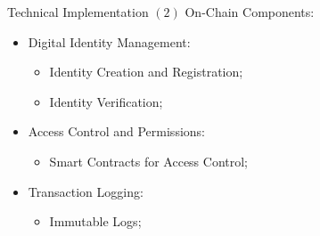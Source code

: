 \documentclass{beamer}
\begin{document}
\begin{frame}{Technical Implementation $(2)$}
\alert{On-Chain Components}:
\begin{itemize}
\item Digital Identity Management:
	\begin{itemize}
		\item Identity Creation and Registration; 
		\item Identity Verification; 
	\end{itemize}
\item Access Control and Permissions:
	\begin{itemize}
		\item Smart Contracts for Access Control; 
	\end{itemize}
\item Transaction Logging:
	\begin{itemize}
		\item Immutable Logs; 
	\end{itemize}
\end{itemize}

\end{frame}
\end{document}
